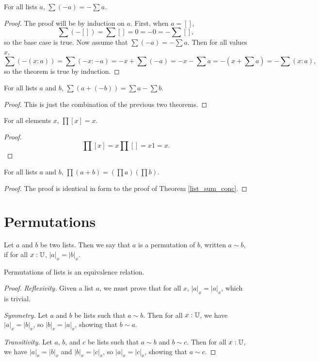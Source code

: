 \documentclass[../../math.tex]{subfiles}
\begin{document}
\begin{theorem} \label{list_sum_neg}
    For all lists $a$, $\sum (-a) = -\sum a$.
\end{theorem}
\begin{proof}
    The proof will be by induction on $a$.  First, when $a = []$,
    \[
        \sum (-[]) = \sum [] = 0 = -0 = -\sum [],
    \]
    so the base case is true.  Now assume that $\sum (-a) = -\sum a$.  Then for
    all values $x$,
    \[
        \sum (-(x : a)) = \sum(-x : -a) = -x + \sum (-a) = -x - \sum a = -(x +
        \sum a) = -\sum (x : a),
    \]
    so the theorem is true by induction.
\end{proof}

\begin{theorem} \label{list_sum_minus}
    For all lists $a$ and $b$, $\sum (a + (-b)) = \sum a - \sum b$.
\end{theorem}
\begin{proof}
    This is just the combination of the previous two theorems.
\end{proof}

\begin{theorem}
    For all elements $x$, $\prod [x] = x$.
\end{theorem}
\begin{proof}
    \[
        \prod [x] = x \prod [] = x 1 = x.
    \]
\end{proof}

\begin{theorem} \label{list_prod_conc}
    For all lists $a$ and $b$, $\prod (a + b) = (\prod a) (\prod b)$.
\end{theorem}
\begin{proof}
    The proof is identical in form to the proof of Theorem \ref{list_sum_conc}.
\end{proof}

\section{Permutations}

\begin{definition}
    Let $a$ and $b$ be two lists.  Then we say that $a$ is a permutation of $b$,
    written $a \sim b$, if for all $x : \mathbb{U}$, $|a|_x = |b|_x$.
\end{definition}

\begin{instance}
    Permutations of lists is an equivalence relation.
\end{instance}
\begin{proof}
    \textit{Reflexivity.}  Given a list $a$, we must prove that for all $x$,
    $|a|_x = |a|_x$, which is trivial.

    \textit{Symmetry.}  Let $a$ and $b$ be lists such that $a \sim b$.  Then for
    all $x : \mathbb{U}$, we have $|a|_x = |b|_x$, so $|b|_x = |a|_x$, showing that $b
    \sim a$.

    \textit{Transitivity.} Let $a$, $b$, and $c$ be lists such that $a \sim b$
    and $b \sim c$.  Then for all $x : \mathbb{U}$, we have $|a|_x = |b|_x$ and $|b|_x =
    |c|_x$, so $|a|_x = |c|_x$, showing that $a \sim c$.
\end{proof}
\end{document}

